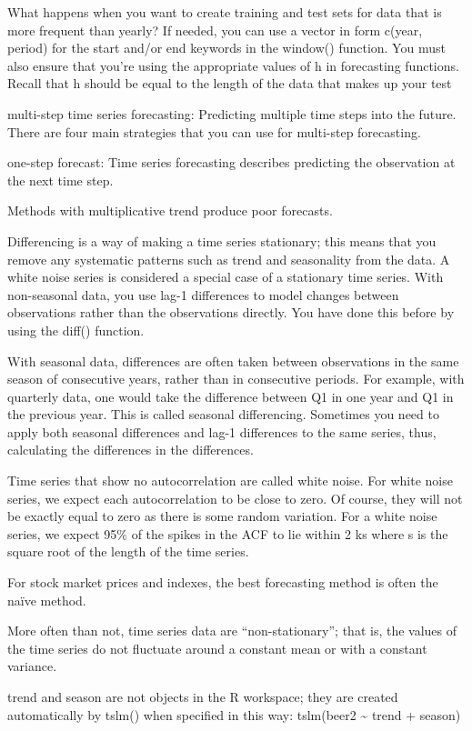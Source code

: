 \documentclass[]{book}
\begin{document}
What happens when you want to create training and test sets for data that is more frequent than yearly? If needed, you can use a vector in form c(year, period) for the start and/or end keywords in the window() function. You must also ensure that you're using the appropriate values of h in forecasting functions. Recall that h should be equal to the length of the data that makes up your test

multi-step time series forecasting: Predicting multiple time steps into the future. There are four main strategies that you can use for multi-step forecasting.

one-step forecast: Time series forecasting describes predicting the observation at the next time step.

Methods with multiplicative trend produce poor forecasts.

Differencing is a way of making a time series stationary; this means that you remove any systematic patterns such as trend and seasonality from the data. A white noise series is considered a special case of a stationary time series. With non-seasonal data, you use lag-1 differences to model changes between observations rather than the observations directly. You have done this before by using the diff() function.

With seasonal data, differences are often taken between observations in the same season of consecutive years, rather than in consecutive periods. For example, with quarterly data, one would take the difference between Q1 in one year and Q1 in the previous year. This is called seasonal differencing. Sometimes you need to apply both seasonal differences and lag-1 differences to the same series, thus, calculating the differences in the differences.

Time series that show no autocorrelation are called white noise. For white noise series, we expect each autocorrelation to be close to zero. Of course, they will not be exactly equal to zero as there is some random variation. For a white noise series, we expect 95\% of the spikes in the ACF to lie within 2 ks where s is the square root of the length of the time series.

For stock market prices and indexes, the best forecasting method is often the naïve method.

More often than not, time series data are ``non-stationary''; that is, the values of the time series do not fluctuate around a constant mean or with a constant variance.

trend and season are not objects in the R workspace; they are created automatically by tslm() when specified in this way: tslm(beer2 \textasciitilde{} trend + season)
\end{document}
